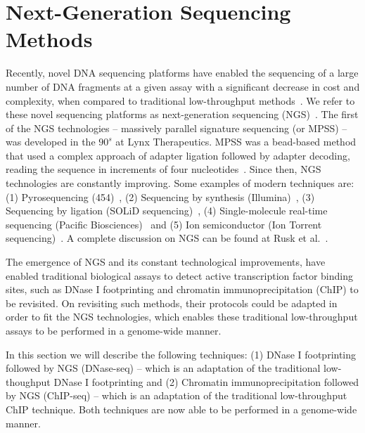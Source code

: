 \section{Next-Generation Sequencing Methods}
\label{sec:ngs.methods}

Recently, novel DNA sequencing platforms have enabled the sequencing of a large number of DNA fragments at a given assay with a significant decrease in cost and complexity, when compared to traditional low-throughput methods~\cite{hayden2014}. We refer to these novel sequencing platforms as next-generation sequencing (NGS)~\cite{shendure2008}. The first of the NGS technologies -- massively parallel signature sequencing (or MPSS) -- was developed in the ${90}^{s}$ at Lynx Therapeutics. MPSS was a bead-based method that used a complex approach of adapter ligation followed by adapter decoding, reading the sequence in increments of four nucleotides~\cite{tucker2009}. Since then, NGS technologies are constantly improving. Some examples of modern techniques are: (1) Pyrosequencing (454)~\cite{margulies2005}, (2) Sequencing by synthesis (Illumina)~\cite{bentley2008}, (3) Sequencing by ligation (SOLiD sequencing)~\cite{valouev2008}, (4) Single-molecule real-time sequencing (Pacific Biosciences)~\cite{eid2009} and (5) Ion semiconductor (Ion Torrent sequencing)~\cite{pennisi2010}. A complete discussion on NGS can be found at Rusk et al.~\cite{rusk2010}.

The emergence of NGS and its constant technological improvements, have enabled traditional biological assays to detect active transcription factor binding sites, such as DNase I footprinting and chromatin immunoprecipitation (ChIP) to be revisited. On revisiting such methods, their protocols could be adapted in order to fit the NGS technologies, which enables these traditional low-throughput assays to be performed in a genome-wide manner.

In this section we will describe the following techniques: (1) DNase I footprinting followed by NGS (DNase-seq) -- which is an adaptation of the traditional low-thoughput DNase I footprinting and (2) Chromatin immunoprecipitation followed by NGS (ChIP-seq) -- which is an adaptation of the traditional low-throughput ChIP technique. Both techniques are now able to be performed in a genome-wide manner.

